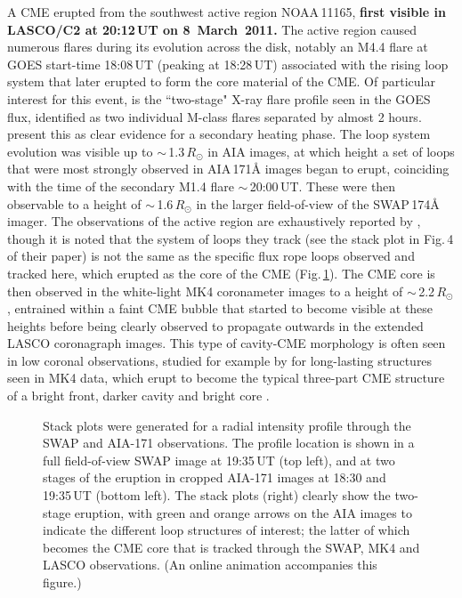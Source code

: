 \documentclass[namedreferences]{solarphysics}
\begin{document}
\begin{article}
A CME erupted from the southwest active region NOAA\,11165, {\bf first visible in LASCO/C2 at 20:12\,UT on 8~March~2011.} The active region caused numerous flares during its evolution across the disk, notably an M4.4 flare at GOES start-time 18:08\,UT (peaking at 18:28\,UT) associated with the rising loop system that later erupted to form the core material of the CME. Of particular interest for this event, is the ``two-stage" X-ray flare profile seen in the GOES flux, identified as two individual M-class flares separated by almost 2 hours.  present this as clear evidence for a secondary heating phase. The loop system evolution was visible up to $\sim$\,1.3\,$R_{\odot}$ in AIA images, at which height a set of loops that were most strongly observed in AIA\,171{\AA} images began to erupt, coinciding with the time of the secondary M1.4 flare $\sim$\,20:00\,UT. These were then observable to a height of $\sim$\,1.6\,$R_{\odot}$ in the larger field-of-view of the SWAP\,174{\AA} imager. The observations of the active region are exhaustively reported by , though it is noted that the system of loops they track (see the stack plot in Fig.\,4 of their paper) is not the same as the specific flux rope loops observed and tracked here, which erupted as the core of the CME (Fig.\,\ref{stackplots}). The CME core is then observed in the white-light MK4 coronameter images to a height of $\sim$\,2.2\,$R_{\odot}$, entrained within a faint CME bubble that started to become visible at these heights before being clearly observed to propagate outwards in the extended LASCO coronagraph images. This type of cavity-CME morphology is often seen in low coronal observations, studied for example by  for long-lasting structures seen in MK4 data, which erupt to become the typical three-part CME structure of a bright front, darker cavity and bright core .  %

\begin{figure}[t]
\caption{Stack plots were generated for a radial intensity profile through the SWAP and AIA-171 observations. The profile location is shown in a full field-of-view SWAP image at 19:35\,UT (top left), and at two stages of the eruption in cropped AIA-171 images at 18:30 and 19:35\,UT (bottom left). The stack plots (right) clearly show the two-stage eruption, with green and orange arrows on the AIA images to indicate the different loop structures of interest; the latter of which becomes the CME core that is tracked through the SWAP, MK4 and LASCO observations. (An online animation accompanies this figure.)}
\label{stackplots}
\end{figure}


\end{article}
\end{document}
